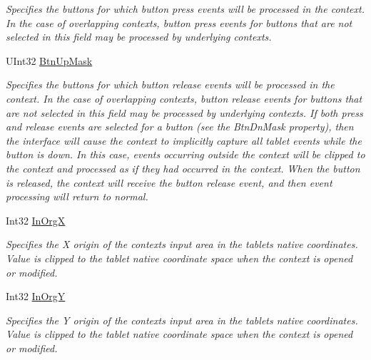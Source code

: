 \begin{DoxyCompactItemize}
\begin{DoxyCompactList}\small\item\em Specifies the buttons for which button press events will be processed in the context. In the case of overlapping contexts, button press events for buttons that are not selected in this field may be processed by underlying contexts. \end{DoxyCompactList}\item 
U\+Int32 \mbox{\hyperlink{class_wintab_d_n_1_1_c_wintab_context_af90630abd6dc8926709bbf875744de8c}{Btn\+Up\+Mask}}
\begin{DoxyCompactList}\small\item\em Specifies the buttons for which button release events will be processed in the context. In the case of overlapping contexts, button release events for buttons that are not selected in this field may be processed by underlying contexts. If both press and release events are selected for a button (see the Btn\+Dn\+Mask property), then the interface will cause the context to implicitly capture all tablet events while the button is down. In this case, events occurring outside the context will be clipped to the context and processed as if they had occurred in the context. When the button is released, the context will receive the button release event, and then event processing will return to normal. \end{DoxyCompactList}\item 
Int32 \mbox{\hyperlink{class_wintab_d_n_1_1_c_wintab_context_a326fb62231cb2f9b783cb29a6716b6b7}{In\+OrgX}}
\begin{DoxyCompactList}\small\item\em Specifies the X origin of the context\textquotesingle{}s input area in the tablet\textquotesingle{}s native coordinates. Value is clipped to the tablet native coordinate space when the context is opened or modified. \end{DoxyCompactList}\item 
Int32 \mbox{\hyperlink{class_wintab_d_n_1_1_c_wintab_context_a0f480b34eb30bf42edd2adf565572ae3}{In\+OrgY}}
\begin{DoxyCompactList}\small\item\em Specifies the Y origin of the context\textquotesingle{}s input area in the tablet\textquotesingle{}s native coordinates. Value is clipped to the tablet native coordinate space when the context is opened or modified. \end{DoxyCompactList}\item 

\end{DoxyCompactItemize}
